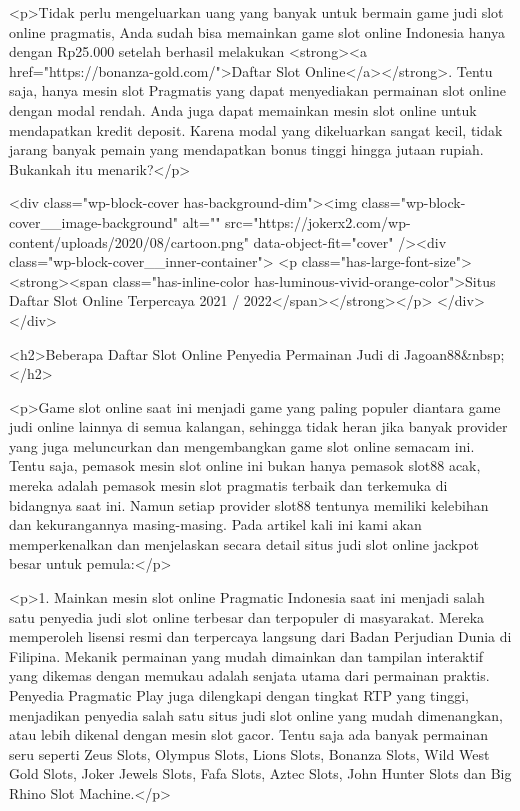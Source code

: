 {<p>Tidak perlu mengeluarkan uang yang banyak untuk bermain game judi slot online pragmatis, Anda sudah bisa memainkan game slot online Indonesia hanya dengan Rp25.000 setelah berhasil melakukan <strong><a href="https://bonanza-gold.com/">Daftar Slot Online</a></strong>. Tentu saja, hanya mesin slot Pragmatis yang dapat menyediakan permainan slot online dengan modal rendah. Anda juga dapat memainkan mesin slot online untuk mendapatkan kredit deposit. Karena modal yang dikeluarkan sangat kecil, tidak jarang banyak pemain yang mendapatkan bonus tinggi hingga jutaan rupiah. Bukankah itu menarik?</p>



<div class="wp-block-cover has-background-dim"><img class="wp-block-cover__image-background" alt="" src="https://jokerx2.com/wp-content/uploads/2020/08/cartoon.png" data-object-fit="cover" /><div class="wp-block-cover__inner-container">
<p class="has-large-font-size"><strong><span class="has-inline-color has-luminous-vivid-orange-color">Situs Daftar Slot Online Terpercaya 2021 / 2022</span></strong></p>
</div></div>



<h2>Beberapa Daftar Slot Online Penyedia Permainan Judi di Jagoan88&nbsp;</h2>



<p>Game slot online saat ini menjadi game yang paling populer diantara game judi online lainnya di semua kalangan, sehingga tidak heran jika banyak provider yang juga meluncurkan dan mengembangkan game slot online semacam ini. Tentu saja, pemasok mesin slot online ini bukan hanya pemasok slot88 acak, mereka adalah pemasok mesin slot pragmatis terbaik dan terkemuka di bidangnya saat ini. Namun setiap provider slot88 tentunya memiliki kelebihan dan kekurangannya masing-masing. Pada artikel kali ini kami akan memperkenalkan dan menjelaskan secara detail situs judi slot online jackpot besar untuk pemula:</p>



<p>1. Mainkan mesin slot online Pragmatic Indonesia saat ini menjadi salah satu penyedia judi slot online terbesar dan terpopuler di masyarakat. Mereka memperoleh lisensi resmi dan terpercaya langsung dari Badan Perjudian Dunia di Filipina. Mekanik permainan yang mudah dimainkan dan tampilan interaktif yang dikemas dengan memukau adalah senjata utama dari permainan praktis. Penyedia Pragmatic Play juga dilengkapi dengan tingkat RTP yang tinggi, menjadikan penyedia salah satu situs judi slot online yang mudah dimenangkan, atau lebih dikenal dengan mesin slot gacor. Tentu saja ada banyak permainan seru seperti Zeus Slots, Olympus Slots, Lions Slots, Bonanza Slots, Wild West Gold Slots, Joker Jewels Slots, Fafa Slots, Aztec Slots, John Hunter Slots dan Big Rhino Slot Machine.</p>



}
